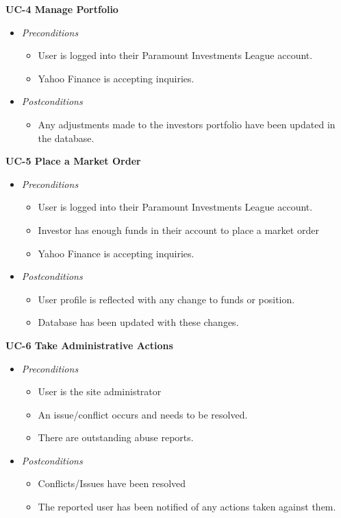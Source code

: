 \textbf{UC-4 Manage Portfolio}
\begin{itemize}
	\item \emph{Preconditions}
		\begin{itemize}
\item User is logged into their Paramount Investments League account. 
\item Yahoo Finance is accepting inquiries. 
		\end{itemize}
	\item \emph{Postconditions}
		\begin{itemize}
\item Any adjustments made to the investors portfolio have been updated in the database.
\end{itemize}
\end{itemize}

\textbf{UC-5 Place a Market Order}
\begin{itemize}
	\item \emph{Preconditions}
		\begin{itemize}
\item User is logged into their Paramount Investments League account. 
\item Investor has enough funds in their account to place a market order
\item Yahoo Finance is accepting inquiries. 

		\end{itemize}
	\item \emph{Postconditions}
		\begin{itemize}
\item User profile is reflected with any change to funds or position.
\item Database has been updated with these changes.
		\end{itemize}
\end{itemize}

\textbf{UC-6 Take Administrative Actions}
\begin{itemize}
	\item \emph{Preconditions}
		\begin{itemize}
\item User is the site administrator
\item An issue/conflict occurs and needs to be resolved.
\item There are outstanding abuse reports.
		\end{itemize}
	\item \emph{Postconditions}
		\begin{itemize}
\item Conflicts/Issues have been resolved
\item The reported user has been notified of any actions taken against them.
		\end{itemize}
\end{itemize}

